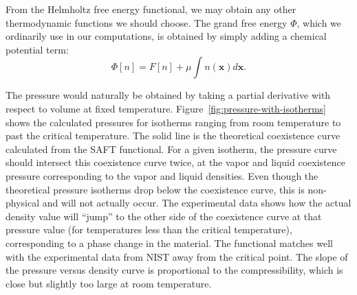 \documentclass[letterpaper,twocolumn,amsmath,amssymb,prb]{revtex4-1}
\newcommand{\xx}{\textbf{x}}
\begin{document}
From the Helmholtz free energy functional, we may obtain any other
thermodynamic functions we should choose.  The grand free energy
$\Phi$, which we ordinarily use in our computations, is obtained by
simply adding a chemical potential term:
\begin{equation}
  \Phi[n] = F[n] + \mu \int n(\xx) d\xx.
\end{equation}

The pressure would naturally be obtained by taking a partial
derivative with respect to volume at fixed temperature. 
Figure~\ref{fig:pressure-with-isotherms} shows the calculated pressures for
isotherms ranging from room temperature to past the critical temperature. The
solid line is the theoretical coexistence curve calculated from the SAFT
functional. For a given isotherm, the pressure curve should intersect this
coexistence curve twice, at the vapor and liquid coexistence 
pressure corresponding to the vapor and liquid densities. Even
though the theoretical pressure isotherms drop below the coexistence curve,
this is non-physical and will not actually occur. The experimental data shows
how the actual density value will ``jump'' to the other side of 
the coexistence curve at that pressure value (for
temperatures less than the critical temperature), corresponding to a phase 
change in the material. The
functional matches well with the experimental data from NIST away from the
critical point. The slope of the pressure versus density curve is proportional
to the compressibility, which is close but slightly too large at room
temperature. 


\end{document}
